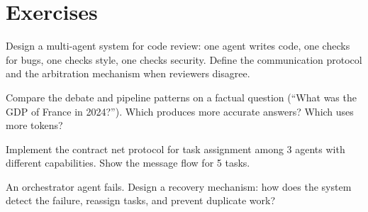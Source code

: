 \section{Exercises}

\begin{exercise}
	Design a multi-agent system for code review: one agent writes code, one checks for bugs, one checks style, one checks security. Define the communication protocol and the arbitration mechanism when reviewers disagree.
\end{exercise}

\begin{exercise}
	Compare the debate and pipeline patterns on a factual question (``What was the GDP of France in 2024?''). Which produces more accurate answers? Which uses more tokens?
\end{exercise}

\begin{exercise}
	Implement the contract net protocol for task assignment among 3 agents with different capabilities. Show the message flow for 5 tasks.
\end{exercise}

\begin{exercise}
	An orchestrator agent fails. Design a recovery mechanism: how does the system detect the failure, reassign tasks, and prevent duplicate work?
\end{exercise}
